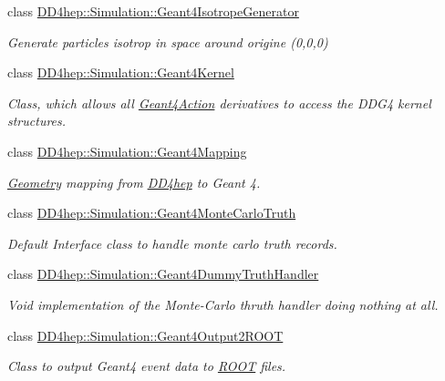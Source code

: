 \begin{DoxyCompactItemize}
class \hyperlink{class_d_d4hep_1_1_simulation_1_1_geant4_isotrope_generator}{D\+D4hep\+::\+Simulation\+::\+Geant4\+Isotrope\+Generator}
\begin{DoxyCompactList}\small\item\em Generate particles isotrop in space around origine (0,0,0) \end{DoxyCompactList}\item 
class \hyperlink{class_d_d4hep_1_1_simulation_1_1_geant4_kernel}{D\+D4hep\+::\+Simulation\+::\+Geant4\+Kernel}
\begin{DoxyCompactList}\small\item\em Class, which allows all \hyperlink{class_d_d4hep_1_1_simulation_1_1_geant4_action}{Geant4\+Action} derivatives to access the D\+D\+G4 kernel structures. \end{DoxyCompactList}\item 
class \hyperlink{class_d_d4hep_1_1_simulation_1_1_geant4_mapping}{D\+D4hep\+::\+Simulation\+::\+Geant4\+Mapping}
\begin{DoxyCompactList}\small\item\em \hyperlink{namespace_d_d4hep_1_1_geometry}{Geometry} mapping from \hyperlink{namespace_d_d4hep}{D\+D4hep} to Geant 4. \end{DoxyCompactList}\item 
class \hyperlink{class_d_d4hep_1_1_simulation_1_1_geant4_monte_carlo_truth}{D\+D4hep\+::\+Simulation\+::\+Geant4\+Monte\+Carlo\+Truth}
\begin{DoxyCompactList}\small\item\em Default Interface class to handle monte carlo truth records. \end{DoxyCompactList}\item 
class \hyperlink{class_d_d4hep_1_1_simulation_1_1_geant4_dummy_truth_handler}{D\+D4hep\+::\+Simulation\+::\+Geant4\+Dummy\+Truth\+Handler}
\begin{DoxyCompactList}\small\item\em Void implementation of the Monte-\/\+Carlo thruth handler doing nothing at all. \end{DoxyCompactList}\item 
class \hyperlink{class_d_d4hep_1_1_simulation_1_1_geant4_output2_r_o_o_t}{D\+D4hep\+::\+Simulation\+::\+Geant4\+Output2\+R\+O\+OT}
\begin{DoxyCompactList}\small\item\em Class to output Geant4 event data to \hyperlink{namespace_r_o_o_t}{R\+O\+OT} files. \end{DoxyCompactList}\item 

\end{DoxyCompactItemize}
